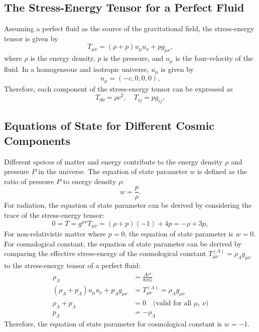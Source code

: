 \subsection{The Stress-Energy Tensor for a Perfect Fluid}
Assuming a perfect fluid as the source of the gravitational field, the stress-energy tensor is given by
\begin{equation}
    T_{\mu\nu} = \left(\rho + p \right) u_{\mu} u_{\nu} + p g_{\mu\nu},
    \label{eq:stress_energy_tensor}
\end{equation}
where \( \rho \) is the energy density, \( p \) is the pressure, and \( u_{\mu} \) is the four-velocity of the fluid.
In a homogeneous and isotropic universe, \( u_{\mu} \) is given by
\begin{equation}
    u_{\mu} = (-c, 0, 0, 0),
    \label{eq:four_velocity}
\end{equation}
Therefore, each component of the stress-energy tensor can be expressed as
\begin{equation}
    T_{00} = \rho c^2, \quad T_{ij} = p g_{ij},
    \label{eq:stress_energy_components}
\end{equation}

\subsection{Equations of State for Different Cosmic Components}
Different speices of matter and energy contribute to the energy density \( \rho \) and pressure \( P \) in the universe. The equation of state parameter \( w \) is defined as the ratio of pressure \( P \) to energy density \( \rho \):
\begin{equation}
    w = \frac{p}{\rho}.
    \label{eq:equation_of_state}
\end{equation}
For radiation, the equation of state parameter can be derived by considering the trace of the stress-energy tensor:
\begin{equation}
    0 = T = g^{\mu\nu} T_{\mu\nu} = (\rho + p)(-1) + 4p = -\rho + 3p,
    \label{eq:stress_energy_trace}
\end{equation}
For non-relativistic matter where $p = 0$, the equation of state parameter is \( w = 0 \). 
For cosmological constant, the equation of state parameter can be derived by comparing the effective stress-energy of the cosmological constant $T_{\mu\nu}^{(\Lambda)} = \rho_{\Lambda} g_{\mu\nu}$ to the stress-energy tensor of a perfect fluid:
\begin{align}
    \rho_{\Lambda} &= \frac{\Lambda c^4}{8\pi G} \label{eq:lambda_density} \\
    \left(\rho_{\Lambda} + p_{\Lambda} \right) u_{\mu} u_{\nu} + p_{\Lambda} g_{\mu\nu} &= T_{\mu\nu}^{(\Lambda)} = \rho_{\Lambda} g_{\mu\nu}  \\
    \rho_{\Lambda} + p_{\Lambda} &= 0 \quad \text{(valid for all $\mu$, $\nu$)} \nonumber \\
    p_{\Lambda} &= -\rho_{\Lambda} \label{eq:lambda_pressure}
\end{align}
Therefore, the equation of state parameter for cosmological constant is \( w = -1 \).

